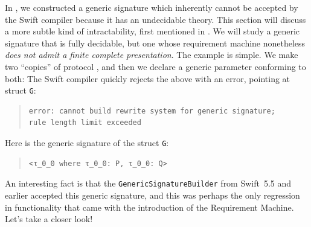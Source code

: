 \documentclass[../generics]{subfiles}
\begin{document}
In , we constructed a generic signature which inherently cannot be accepted by the Swift compiler because it has an undecidable theory. This section will discuss a more subtle kind of intractability, first mentioned in . We will study a generic signature that is fully decidable, but one whose requirement machine nonetheless \textsl{does not admit a finite complete presentation}. The example is simple. We make two ``copies'' of protocol \tN, and then we declare a generic parameter conforming to both:
The Swift compiler quickly rejects the above with an error, pointing at struct \texttt{G}:
\begin{quote}
\begin{verbatim}
error: cannot build rewrite system for generic signature;
rule length limit exceeded
\end{verbatim}
\end{quote}
Here is the generic signature of the struct \texttt{G}:
\begin{quote}
\begin{verbatim}
<τ_0_0 where τ_0_0: P, τ_0_0: Q>
\end{verbatim}
\end{quote}
An interesting fact is that the \texttt{GenericSignatureBuilder} from Swift~5.5 and earlier accepted this generic signature, and this was perhaps the only regression in functionality that came with the introduction of the Requirement Machine. Let's take a closer look!
\end{document}
